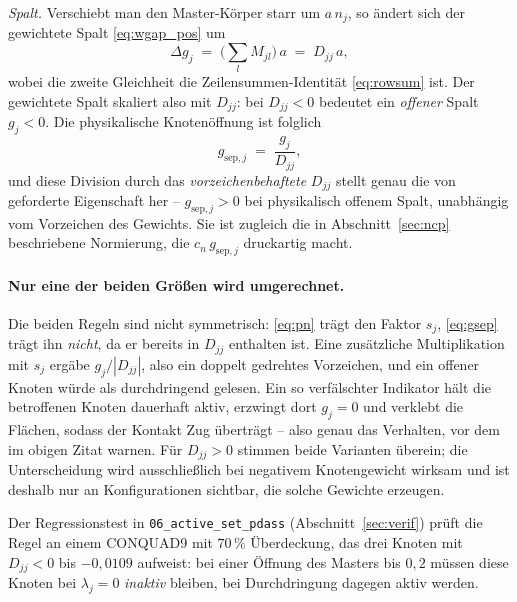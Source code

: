 \documentclass[a4paper,11pt]{article}
\def\bm#1{#1}%
\def\tilde#1{#1}%
\newcommand{\file}[1]{\texttt{\small #1}}
\begin{document}
\emph{Spalt.} Verschiebt man den Master-Körper starr um $a\,\bm n_j$, so ändert sich der gewichtete
Spalt \eqref{eq:wgap_pos} um
\begin{equation}
\Delta\tilde g_j \;=\; \Big(\sum_l M_{jl}\Big)\,a \;=\; \tilde D_{jj}\,a ,
\label{eq:gapscale}
\end{equation}
wobei die zweite Gleichheit die Zeilensummen-Identität \eqref{eq:rowsum} ist. Der gewichtete Spalt
skaliert also mit $\tilde D_{jj}$: bei $\tilde D_{jj}<0$ bedeutet ein \emph{offener} Spalt
$\tilde g_j<0$. Die physikalische Knotenöffnung ist folglich
\begin{equation}
g_{\text{sep},j} \;=\; \frac{\tilde g_j}{\tilde D_{jj}} ,
\label{eq:gsep}
\end{equation}
und diese Division durch das \emph{vorzeichenbehaftete} $\tilde D_{jj}$ stellt genau die von
\citet{popp2012} geforderte Eigenschaft her -- $g_{\text{sep},j}>0$ bei physikalisch offenem Spalt,
unabhängig vom Vorzeichen des Gewichts. Sie ist zugleich die in Abschnitt~\ref{sec:ncp} beschriebene
Normierung, die $c_n\,g_{\text{sep},j}$ druckartig macht.

\paragraph{Nur eine der beiden Größen wird umgerechnet.}
Die beiden Regeln sind nicht symmetrisch: \eqref{eq:pn} trägt den Faktor $s_j$, \eqref{eq:gsep}
trägt ihn \emph{nicht}, da er bereits in $\tilde D_{jj}$ enthalten ist. Eine zusätzliche
Multiplikation mit $s_j$ ergäbe $\tilde g_j/|\tilde D_{jj}|$, also ein doppelt gedrehtes
Vorzeichen, und ein offener Knoten würde als durchdringend gelesen. Ein so verfälschter Indikator
hält die betroffenen Knoten dauerhaft aktiv, erzwingt dort $\tilde g_j=0$ und verklebt die Flächen,
sodass der Kontakt Zug überträgt -- also genau das Verhalten, vor dem \citet[Abschn.~4.3]{popp2012}
im obigen Zitat warnen. Für $\tilde D_{jj}>0$ stimmen beide Varianten überein; die Unterscheidung
wird ausschließlich bei negativem Knotengewicht wirksam und ist deshalb nur an Konfigurationen
sichtbar, die solche Gewichte erzeugen.

Der Regressionstest in \file{06\_active\_set\_pdass} (Abschnitt~\ref{sec:verif}) prüft die Regel an
einem CONQUAD9 mit $70\,\%$ Überdeckung, das drei Knoten mit $\tilde D_{jj}<0$ bis $-0{,}0109$
aufweist: bei einer Öffnung des Masters bis $0{,}2$ müssen diese Knoten bei $\lambda_j=0$
\emph{inaktiv} bleiben, bei Durchdringung dagegen aktiv werden.
\end{document}

